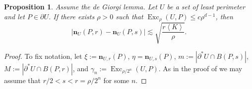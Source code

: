 \documentclass[reqno,10pt]{amsart}
\DeclareMathOperator{\Exc}{Exc}
\newcommand{\normal}{\mathbf n}
\def\Japan#1{\left \langle #1 \right \rangle}
\newtheorem{proposition}[theorem]{Proposition}
\theoremstyle{definition}
\numberwithin{equation}{section}
\begin{document}
\begin{proposition}\label{implication of DGL}
    Assume the de Giorgi lemma. Let $U$ be a set of least perimeter and let $P \in \partial U$.
    If there exists $\rho > 0$ such that $\Exc_\rho(U, P) \leq c\rho^{d - 1}$, then
    \begin{equation}\label{LC Cauchy}
    |\normal_U(P, r) - \normal_U(P, s)| \lesssim \sqrt{\frac{r \Japan K}{\rho}}.
    \end{equation}
\end{proposition}
\begin{proof}
To fix notation, let
$\xi := \normal_{U, r}(P)$, $\eta = \normal_{U, s}(P)$, $m := |\partial^* U \cap B(P, s)|$, $M := |\partial^* U \cap B(P, r)|$, and $\gamma_n := \Exc_{\rho/2^n}(U, P)$.
As in the proof of \cite[Theorem 8.2]{Giusti77} we may assume that $r/2 < s < r = \rho/2^n$ for some $n$.


\end{proof}
\end{document}
